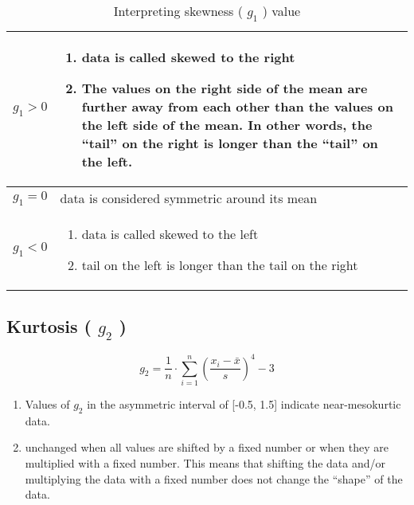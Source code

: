 \begin{customTableWrapper}{1.5}
\begin{table}[H]
    \centering
    \begin{tabular}{|c|m{13cm}|}
        \hline
        $g_1 > 0$ & \vspace{0.5cm}\begin{enumerate}
            \item data is called skewed to the right
            \item The values on the right side of the mean are further away from each other than the values on the left side of the mean. In other words, the “tail” on the right is longer than the “tail” on the left.
        \end{enumerate}\vspace{-0.5cm} \\ \hline
        $g_1 = 0$ & data is considered symmetric around its mean \\ \hline
        $g_1 < 0$ & \vspace{0.5cm} \begin{enumerate}
            \item data is called skewed to the left
            \item tail on the left is longer than the tail on the right
        \end{enumerate} \vspace{-1cm} \\ \hline
    \end{tabular}
    \caption{Interpreting skewness ( $g_1$ ) value}
\end{table}
\end{customTableWrapper}

\subsection{Kurtosis ( $g_2$ ) \cite{ism-1}}\label{Kurtosis}
\[
    g_2 = \displaystyle\dfrac{1}{n} \cdot \sum_{i=1}^{n} \left( \dfrac{x_i - \bar{x}}{s} \right)^4 - 3
\]

\begin{enumerate}
    \item Values of $g_2$ in the asymmetric interval of [-0.5, 1.5] indicate near-mesokurtic data.
    \item unchanged when all values are shifted by a fixed number or when they are multiplied with a fixed number. This means that shifting the data and/or multiplying the data with a fixed number does not change the “shape” of the data.
\end{enumerate}

